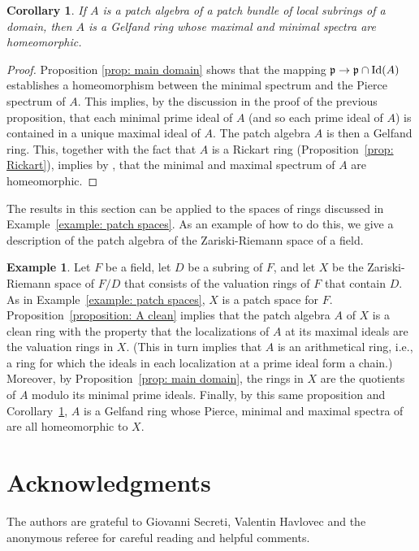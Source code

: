 \documentclass[11pt]{amsart}
\newtheorem{corollary}[theorem]{Corollary}
\theoremstyle{definition}
\newtheorem{example}[theorem]{Example}
\def\Id{\mbox{\rm Id}}
\begin{document}
\begin{corollary} \label{cor: local}
If $A$ is a patch algebra of a patch bundle of local subrings of a domain, then $A$ is a Gelfand ring whose maximal and minimal spectra are homeomorphic. 
\end{corollary}
\begin{proof}
Proposition \ref{prop: main domain} shows that the mapping $\mathfrak p \rightarrow \mathfrak p \cap \Id(A)$ establishes a homeomorphism between the minimal spectrum and the Pierce spectrum of $A$. This implies, by the discussion in the proof of the previous proposition, that each  minimal prime ideal of $A$ (and so each prime ideal of $A$) is contained in a unique maximal ideal of $A$. The patch algebra $A$ is then a Gelfand ring. This, together with the fact that $A$ is a Rickart ring (Proposition~\ref{prop: Rickart}), implies by \cite[Theorem 4.2 (d)]{Kist}, that the minimal and maximal spectrum of $A$ are homeomorphic. \end{proof}

The results in this section can be applied   to the spaces of rings discussed in Example~\ref{example: patch spaces}. As an example of how to do this, we give  a description of the patch algebra of the Zariski-Riemann space of a field. 

\begin{example} \label{example: ZS}
Let $F$ be a field, let $D$ be a subring of $F$, and let $X$ be the Zariski-Riemann space of $F/D$ that consists of the valuation rings of $F$ that contain $D$. As in Example~\ref{example: patch spaces}, $X$ is a patch space for $F$. 
Proposition~\ref{proposition: A clean} implies that the patch algebra $A$ of $X$ is a clean ring  with the property that the localizations of $A$ at its maximal  ideals are the valuation rings in $X$. (This in turn implies that $A$ is an arithmetical ring, i.e., a ring for which the ideals in each localization at a prime ideal form a chain.)  
Moreover, by Proposition~\ref{prop: main domain}, the rings in $X$ are the quotients of $A$ modulo its minimal prime ideals.  Finally, by this same proposition and  
 Corollary~\ref{cor: local}, $A$ is a Gelfand ring whose 
Pierce, minimal and maximal spectra of are all homeomorphic to $X$. 
\end{example}


\section*{Acknowledgments}
The authors are grateful to Giovanni Secreti, Valentin Havlovec and the anonymous referee for careful reading and helpful comments.
\end{document}
